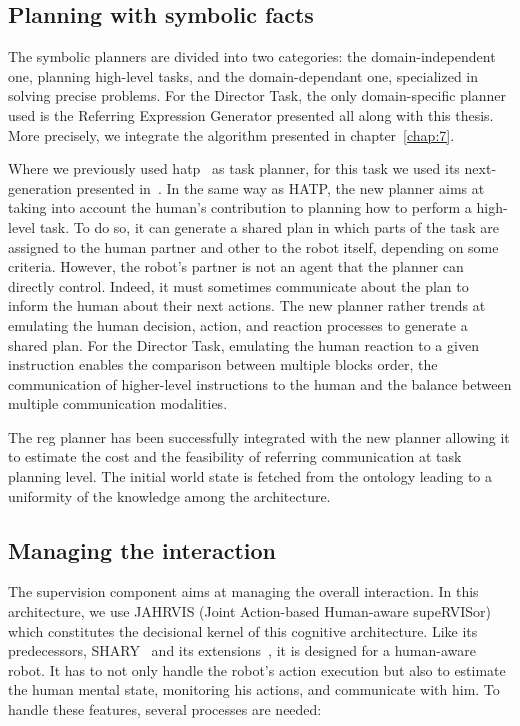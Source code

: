 \subsection{Planning with symbolic facts}

The symbolic planners are divided into two categories: the domain-independent one, planning high-level tasks, and the domain-dependant one, specialized in solving precise problems. For the Director Task, the only domain-specific planner used is the Referring Expression Generator presented all along with this thesis. More precisely, we integrate the algorithm presented in chapter~\ref{chap:7}.

Where we previously used \acrshort{hatp}~\cite{lallement_2014_hatp} as task planner, for this task we used its next-generation presented in~\cite{buisan_2021_human}. In the same way as HATP, the new planner aims at taking into account the human's contribution to planning how to perform a high-level task. To do so, it can generate a shared plan in which parts of the task are assigned to the human partner and other to the robot itself, depending on some criteria. However, the robot's partner is not an agent that the planner can directly control. Indeed, it must sometimes communicate about the plan to inform the human about their next actions. The new planner rather trends at emulating the human decision, action, and reaction processes to generate a shared plan. For the Director Task, emulating the human reaction to a given instruction enables the comparison between multiple blocks order, the communication of higher-level instructions to the human and the balance between multiple communication modalities.

The \acrshort{reg} planner has been successfully integrated with the new planner allowing it to estimate the cost and the feasibility of referring communication at task planning level. The initial world state is fetched from the ontology leading to a uniformity of the knowledge among the architecture.

\subsection{Managing the interaction}

The supervision component aims at managing the overall interaction. In this architecture, we use JAHRVIS (Joint Action-based Human-aware supeRVISor) which constitutes the decisional kernel of this cognitive architecture. Like its predecessors, SHARY~\cite{clodic_2009_shary} and its extensions~\cite{fiore_2016_planning, devin_2016_implemented}, it is designed for a human-aware robot. It has to not only handle the robot's action execution but also to estimate the human mental state, monitoring his actions, and communicate with him. To handle these features, several processes are needed:

